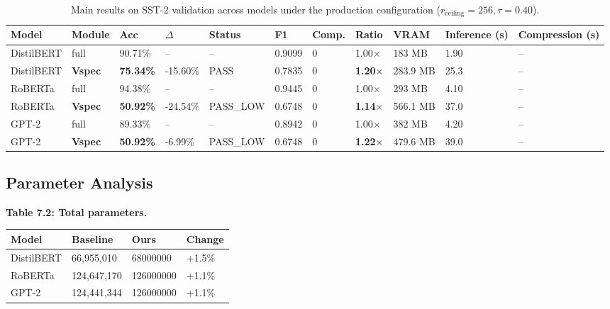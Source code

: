 \begin{table}[t]
\centering
\small
\begin{tabular}{lllllllllll}
\toprule
\textbf{Model} & \textbf{Module} & \textbf{Acc} & \textbf{$\Delta$} & \textbf{Status} & \textbf{F1} & \textbf{Comp.} & \textbf{Ratio} & \textbf{VRAM} & \textbf{Inference (s)} & \textbf{Compression (s)} \\
\midrule
DistilBERT & full & 90.71\% & -- & -- & 0.9099 & 0 & 1.00$\times$ & 183 MB & 1.90 & -- \\
DistilBERT & \textbf{Vspec} & \textbf{75.34\%} & -15.60\% & PASS & 0.7835 & 0 & \textbf{1.20$\times$} & 283.9 MB & 25.3 & -- \\
RoBERTa & full & 94.38\% & -- & -- & 0.9445 & 0 & 1.00$\times$ & 293 MB & 4.10 & -- \\
RoBERTa & \textbf{Vspec} & \textbf{50.92\%} & -24.54\% & PASS\_LOW & 0.6748 & 0 & \textbf{1.14$\times$} & 566.1 MB & 37.0 & -- \\
GPT-2 & full & 89.33\% & -- & -- & 0.8942 & 0 & 1.00$\times$ & 382 MB & 4.20 & -- \\
GPT-2 & \textbf{Vspec} & \textbf{50.92\%} & -6.99\% & PASS\_LOW & 0.6748 & 0 & \textbf{1.22$\times$} & 479.6 MB & 39.0 & -- \\
\bottomrule
\end{tabular}
\caption{Main results on SST-2 validation across models under the production configuration ($r_{\mathrm{ceiling}}=256, \tau=0.40$).}
\label{tab:main_sst2}
\end{table}

\subsection{Parameter Analysis}

\textbf{Table 7.2: Total parameters.}

\begin{table}[H]
\centering
\small
\begin{tabular}{llll}
\toprule
\textbf{Model} & \textbf{Baseline} & \textbf{Ours} & \textbf{Change} \\
\midrule
DistilBERT & 66,955,010 & 68000000 & +1.5\% \\
RoBERTa & 124,647,170 & 126000000 & +1.1\% \\
GPT-2 & 124,441,344 & 126000000 & +1.1\% \\
\bottomrule
\end{tabular}
\end{table}

